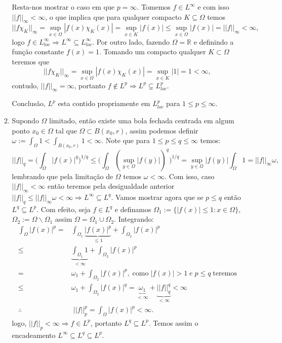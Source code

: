 \documentclass{article}
\begin{document}
\begin{enumerate}
\begin{enumerate}
			Resta-nos mostrar o caso em que $p=\infty$. Tomemos $f \in L^{\infty}$ e com isso $||f||_{\infty} < \infty$, o que implica que para qualquer compacto $K \subseteq \Omega$ temos 
			$$
			||f\chi_{K}||_{\infty} = \sup_{x \in \Omega}|f(x)\chi_{K} (x)|= \sup_{x \in K}|f(x)| \leq \sup_{x \in \Omega}|f(x)| = ||f||_{\infty} < \infty,
			$$
			logo $f \in L^{\infty}_{loc} \Rightarrow L^{\infty} \subseteq L^{\infty}_{loc}$. Por outro lado, fazendo $\Omega = \mathbb{R}$ e definindo a função constante $f(x) = 1$. Tomando um compacto qualquer $K \subset \Omega$ teremos que 
			$$
			||f \chi_{K}||_{\infty} = \sup_{x \in \Omega}|f(x)\chi_{K} (x)| = \sup_{x \in K}|1| = 1 < \infty,
			$$
			contudo, 
			$||f||_{\infty} = \infty$, portanto $f \notin L^{p} \Rightarrow L^{p} \subsetneq L^{p}_{loc}$.
			
			Conclusão, $L^{p}$ esta contido propriamente em $L^{p}_{loc}$ para $1 \leq p \leq \infty$.
			
			\item Supondo $\Omega$ limitado, então existe uma bola fechada centrada em algum ponto $x_{0} \in \Omega$ tal que $\Omega \subset B(x_{0}, r)$, assim podemos definir $\omega := \int_{\Omega} 1 < \int_{B(x_0, r)} 1 < \infty$. Note que para $1 \leq p \leq q \leq \infty$ temos:
			$$
			||f||_{q} = \Big( \int_{\Omega} |f(x)|^{q} \Big)^{1/q} \leq \Big( \int_{\Omega} (\sup_{y \in \Omega}|f(y)|)^{q} \Big)^{1/q} = \sup_{y \in \Omega}|f(y)|\int_{\Omega} 1 = ||f||_{\infty}\omega,
			$$
			lembrando que pela limitação de $\Omega$ temos $\omega < \infty$. Com isso, caso $||f||_{\infty} < \infty$ então teremos pela desigualdade anterior $||f||_{q} \leq ||f||_{\infty}\omega < \infty \Rightarrow L^{\infty} \subseteq L^{q}$. Vamos mostrar agora que se $p \leq q$ então $L^{q} \subseteq L^{p}$. Com efeito, seja $f \in L^{q}$ e definamos $\Omega_{1} := \{ |f(x)| \leq 1: x \in \Omega \}$,  $\Omega_{2} := \Omega\backslash\Omega_{1}$ assim $\Omega = \Omega_{1} \cup \Omega_{2}$. Integrando:
			$$
			\begin{aligned}
			\int_{\Omega}|f(x)|^{p}
			= & \int_{\Omega_{1}} \underbrace{|f(x)|^{p}}_{\leq 1} + \int_{\Omega_{2}}|f(x)|^{p} \\
			\leq & \underbrace{ \int_{\Omega_{1}} 1 }_{< \infty}  + \int_{\Omega_{2}}|f(x)|^{p} \\
			= & \omega_{1} + \int_{\Omega_{2}} |f(x)|^{p}, \; \text{como} \; |f(x)|>1 \; e \; p\leq q \; \text{teremos}\\ 
			\leq & \omega_{1} + \int_{\Omega_{2}}|f(x)|^{q} = \underbrace{ \omega_{1} }_{< \infty }+ \underbrace{ ||f||_{q}^{q} }_{< \infty} < \infty \\
			\therefore & \; ||f||_{p}^{p} = \int_{\Omega}|f(x)|^{p} < \infty.
			\end{aligned}
			$$
			logo, $||f||_{p} <\infty \Rightarrow f \in L^{p}$, portanto $L^{q} \subseteq L^{p}$. Temos assim o encadeamento $L^{\infty} \subseteq L^{q} \subseteq L^{p}$. 
			

\end{enumerate}
\end{enumerate}
\end{document}
